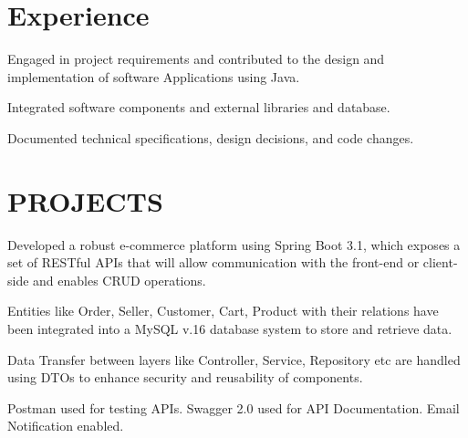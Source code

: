 \documentclass[]{deedy-resume-openfont}
\begin{document}
\begin{minipage}[t]{0.66\textwidth} 



\section{Experience}

\vspace{\topsep} %
\begin{tightemize}
\item Engaged in project requirements and contributed to the design and implementation of software Applications using Java.
\item Integrated software components and external libraries and database.
\item Documented technical specifications, design decisions, and code changes.
\end{tightemize}
\sectionsep





\section{PROJECTS}
\begin{tightemize}
\item Developed a robust e-commerce platform using Spring Boot 3.1, which exposes a set of RESTful APIs that will allow communication with the front-end or client-side and enables CRUD operations.
\item Entities like Order, Seller, Customer, Cart, Product with their relations have been integrated into a MySQL v.16 database system to store and retrieve data.
\item Data Transfer between layers like Controller, Service, Repository etc are handled using DTOs to enhance security and reusability of components. 
\item Postman used for testing APIs. Swagger 2.0 used for API Documentation. Email Notification enabled.
\end{tightemize}
\sectionsep



\end{minipage}
\end{document}
